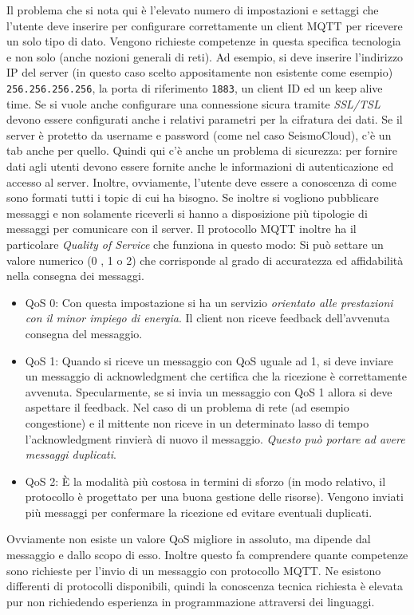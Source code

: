 \documentclass[a4paper,10pt]{memoir}
\begin{document}
Il problema che si nota qui è l'elevato numero di impostazioni e settaggi che l'utente deve inserire per configurare correttamente un client MQTT per ricevere un solo tipo di dato.
Vengono richieste competenze in questa specifica tecnologia e non solo (anche nozioni generali di reti). Ad esempio, si deve inserire l'indirizzo IP del server (in questo caso scelto appositamente non esistente come esempio) \texttt{256.256.256.256}, la porta di riferimento \texttt{1883}, un client ID ed un keep alive time. Se si vuole anche configurare una connessione sicura tramite \textit{SSL/TSL} devono essere configurati anche i relativi parametri per la cifratura dei dati.
Se il server è protetto da username e password (come nel caso SeismoCloud), c'è un tab anche per quello. Quindi qui c'è anche un problema di sicurezza: per fornire dati agli utenti devono essere fornite anche le informazioni di autenticazione ed accesso al server.
Inoltre, ovviamente, l'utente deve essere a conoscenza di come sono formati tutti i topic di cui ha bisogno.
Se inoltre si vogliono pubblicare messaggi e non solamente riceverli si hanno a disposizione più tipologie di messaggi per comunicare con il server.
Il protocollo MQTT inoltre ha il particolare \textit{Quality of Service} che funziona in questo modo:
Si può settare un valore numerico (0 , 1 o 2) che corrisponde al grado di accuratezza ed affidabilità nella consegna dei messaggi.

\begin{itemize}
    \item QoS 0: Con questa impostazione si ha un servizio \textit{orientato alle prestazioni con il minor impiego di energia}. Il client non riceve feedback dell'avvenuta consegna del messaggio.
    \item QoS 1: Quando si riceve  un messaggio con QoS uguale ad 1, si deve inviare un messaggio di acknowledgment che certifica che la ricezione è correttamente avvenuta. Specularmente, se si invia un messaggio con QoS 1 allora si deve aspettare il feedback. Nel caso di un problema di rete (ad esempio congestione) e il mittente non riceve in un determinato lasso di tempo l'acknowledgment rinvierà di nuovo il messaggio. \textit{Questo può portare ad avere messaggi duplicati}.
    \item QoS 2: È la modalità più costosa in termini di sforzo (in modo relativo, il protocollo è progettato per una buona gestione delle risorse). Vengono inviati più messaggi per confermare la ricezione ed evitare eventuali duplicati.
\end{itemize}
Ovviamente non esiste un valore QoS migliore in assoluto, ma dipende dal messaggio e dallo scopo di esso.
Inoltre questo fa comprendere quante competenze sono richieste per l'invio di un messaggio con protocollo MQTT.
Ne esistono differenti di protocolli disponibili, quindi la conoscenza tecnica richiesta è elevata pur non richiedendo esperienza in programmazione attraversi dei linguaggi.
\end{document}
